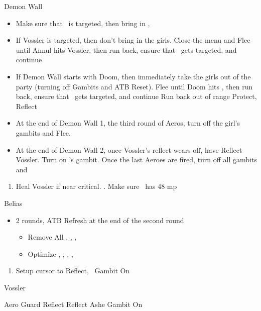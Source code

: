 \begin{battle}{Demon Wall}
	\begin{itemize}
		\item Make sure that \vaan\ is targeted, then bring in \ashe, \penelo
		\item If Vossler is targeted, then don't bring in the girls. Close the menu and Flee until Annul hits Vossler, then run back, ensure that \vaan\ gets targeted, and continue
		\item If Demon Wall starts with Doom, then immediately take the girls out of the party (turning off Gambits and ATB Reset). Flee until Doom hits \vaan, then run back, ensure that \vaan\ gets targeted, and continue
		      \vaanf Run back out of range
		      \vaanf Protect, Reflect \vaan
		\item At the end of Demon Wall 1, the third round of Aeros, turn off the girl's gambits and Flee.
		\item At the end of Demon Wall 2, once Vossler's reflect wears off, have \vaan Reflect Vossler. Turn on \vaan's gambit. Once the last Aeroes are fired, turn off all gambits and \leader{\ashe}
	\end{itemize}
\end{battle}
\begin{enumerate}
	\item Heal Vossler if near critical. . Make sure \penelo\ has 48 mp
\end{enumerate}
\begin{battle}{Belias}
	\begin{itemize}
		\vaanf Reflect Vossler, then pick up chest
		\vaanf Reflect \vaan
		\item 2 rounds, ATB Refresh at the end of the second round
		      \begin{equip}
			      \begin{itemize}
				      \item Remove All \vaan, \penelo, \ashe, \basch
				      \item Optimize \basch, \balthier, \vaan, \ashe, \penelo
			      \end{itemize}
		      \end{equip}
	\end{itemize}
\end{battle}
\begin{enumerate}
	\item Setup cursor to Reflect, \penelo\ Gambit On
\end{enumerate}
\begin{battle}{Vossler}
	\begin{itemize}
		\ashef Aero Guard
		\vaanf Reflect \vaan
		\penelof Reflect Ashe
		\ashef Gambit On
	\end{itemize}
\end{battle}